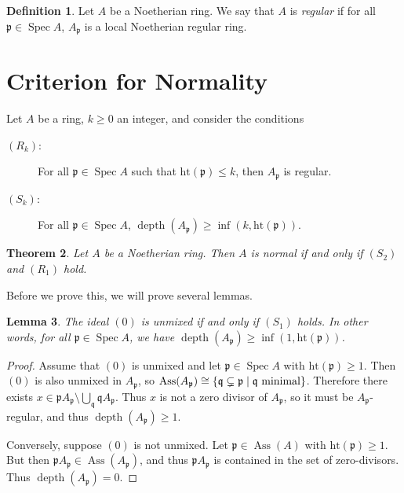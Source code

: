 \documentclass[leqno, openany]{memoir}
\newtheorem{thm}{Theorem}[section]
\newtheorem{lem}[thm]{Lemma}
\theoremstyle{definition}
\newtheorem{defn}[thm]{Definition}
\theoremstyle{remark}
\theoremstyle{plain}
\theoremstyle{definition}
\theoremstyle{remark}
\newcommand{\mf}[1]{\mathfrak{#1}}
\newcommand{\mr}[1]{\mathrm{#1}}
\DeclareMathOperator{\Spec}{Spec}
\DeclareMathOperator{\Ass}{Ass}
\DeclareMathOperator{\dpth}{depth}
\begin{document}
\begin{defn} Let $A$ be a Noetherian ring. We say that $A$ is \textit{regular}
if for all $\mf{p} \in \Spec A$, $A_{\mf{p}}$ is a local Noetherian regular
ring.  \end{defn}

\section{Criterion for Normality}%

Let $A$ be a ring, $k \geq 0$ an integer, and consider the conditions
\begin{description} \item[$(R_k)$:] For all $\mf{p} \in \Spec A$ such that
    $\mr{ht}(\mf{p}) \leq k$, then $A_{\mf{p}}$ is regular.  \item[$(S_k)$:]
    For all $\mf{p} \in \Spec A$, $\dpth(A_{\mf{p}}) \geq \inf (k,
    \mr{ht}(\mf{p}))$.  \end{description}

\begin{thm}\label{thm:normalcrit} Let $A$ be a Noetherian ring. Then $A$ is
normal if and only if $(S_2)$ and $(R_1)$ hold.  \end{thm}

Before we prove this, we will prove several lemmas.

\begin{lem} The ideal $(0)$ is unmixed if and only if $(S_1)$ holds. In other
words, for all $\mf{p} \in \Spec A$, we have $\dpth(A_{\mf{p}}) \geq \inf(1,
\mr{ht}(\mf{p}))$.  \end{lem}

\begin{proof} Assume that $(0)$ is unmixed and let $\mf{p} \in \Spec A$ with
    $\mr{ht}(\mf{p}) \geq 1$. Then $(0)$ is also unmixed in $A_{\mf{p}}$, so
    $\Ass(A_{\mf{p}}) \cong \qty{\mf{q} \subsetneq \mf{p} \mid \mf{q} \text{
    minimal}}$. Therefore there exists $x \in \mf{p} A_{\mf{p}} \setminus
    \bigcup_{\mf{q}} \mf{q} A_{\mf{p}}$. Thus $x$ is not a zero divisor of
    $A_{\mf{p}}$, so it must be $A_{\mf{p}}$-regular, and thus
    $\dpth(A_{\mf{p}}) \geq 1$.

    Conversely, suppose $(0)$ is not unmixed. Let $\mf{p} \in \Ass(A)$ with
$\mr{ht}(\mf{p}) \geq 1$. But then $\mf{p} A_{\mf{p}} \in \Ass(A_{\mf{p}})$,
and thus $\mf{p} A_{\mf{p}}$ is contained in the set of zero-divisors. Thus
$\dpth(A_{\mf{p}}) = 0$.  \end{proof}
\end{document}
